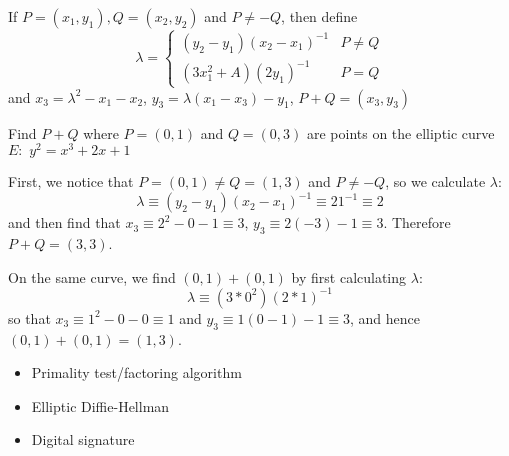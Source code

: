 If $P = ({x}_{1}, {y}_{1}), Q = ({x}_{2}, {y}_{2})$
and $P 
\neq-Q$, then define
$$ \lambda =\begin{cases} (y_{2}-y_{1}){(x_{2}-x_{1})}^{-1} &  P\neq Q \\ (3x_{1}^2+A){(2y_{1})}^{-1} &  P = Q \end{cases}$$
and ${x}_{3} = {\lambda}^{2}-{x}_{1}-{x}_{2}$, ${y}_{3} = \lambda({x}_{1}-{x}_{3})-{y}_1$, $P+Q=({x}_{3}, {y}_{3})$

\begin{example} Find $P + Q$ where $P = (0,1)$ and $Q = (0,3)$ are points on the elliptic curve $E: \, \, y^{2}=x^{3}+2x+1$

First, we notice that $P = (0,1) \not = Q = (1,3)$ and $P \not = -Q$, so we calculate $\lambda$:
\[\lambda \equiv (y_{2}-y_{1}){({x}_{2}-x_{1})}^{-1} \equiv 2{1}^{-1} \equiv 2\]
and then find that ${x}_{3} \equiv 2^2 - 0 - 1 \equiv 3$, ${y}_{3} \equiv 2(-3) - 1 \equiv 3$.
Therefore $P + Q = (3,3)$.
\end{example}

\begin{example} On the same curve, we find $(0,1) + (0,1)$ by first calculating $\lambda$: 
\[\lambda \equiv (3*{0}^{2}){(2*1)}^{-1}\] so that 
${x}_{3} \equiv 1^2 - 0 - 0 \equiv 1$ and ${y}_3 \equiv 1(0 - 1) - 1 \equiv 3$, and hence $(0,1) + (0,1) = (1,3)$. \end{example}
\begin{itemize}
\item Primality test/factoring algorithm 
\item Elliptic Diffie-Hellman
\item Digital signature
\end{itemize}





